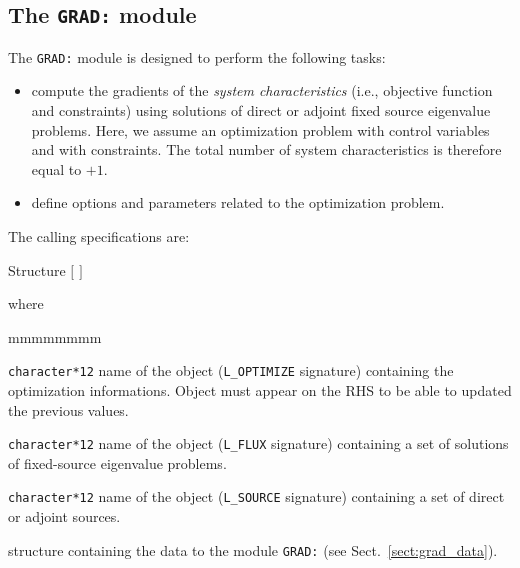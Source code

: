 \subsection{The \texttt{GRAD:} module}

The {\tt GRAD:} module is designed to perform the following tasks:
\begin{itemize}
\item compute the gradients of the {\sl system characteristics} (i.e., objective function and constraints) using
solutions of direct or adjoint fixed source eigenvalue problems. Here, we assume an optimization problem with 
control variables and with  constraints. The total number of system characteristics is therefore equal to
$+1$.

\item define options and parameters related to the optimization problem.
\end{itemize}

\vskip 0.08cm

The calling specifications are:

\begin{DataStructure}{Structure }
 \moc{:=}  $[$  $]$   \moc{::} 
\end{DataStructure}

\noindent where

\begin{ListeDeDescription}{mmmmmmmm}

\item[\dusa{OPTIM}] \texttt{character*12} name of the  object ({\tt L\_OPTIMIZE} signature) containing the
optimization informations. Object  must appear on the RHS to be able to updated the previous values.

\item[\dusa{DFLUX}] \texttt{character*12} name of the  object ({\tt L\_FLUX} signature) containing a set of
solutions of fixed-source eigenvalue problems.

\item[\dusa{GPT}] \texttt{character*12} name of the  object ({\tt L\_SOURCE} signature) containing a set of
direct or adjoint sources.

\item[\dstr{grad\_data}] structure containing the data to the module \texttt{GRAD:} (see Sect.~\ref{sect:grad_data}).

\end{ListeDeDescription}
\vskip 0.2cm

